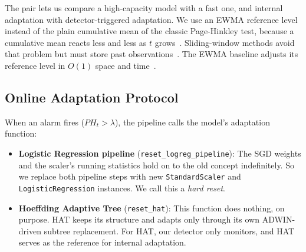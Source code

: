 \documentclass[conference]{IEEEtran}
\begin{document}
The pair lets us compare a high-capacity model with a fast one, and internal adaptation with detector-triggered adaptation.
We use an EWMA reference level instead of the plain cumulative mean of the classic Page-Hinkley test, because a cumulative mean reacts less and less as $t$ grows~\cite{parasteh2024}.
Sliding-window methods avoid that problem but must store past observations~\cite{mulimani2024}.
The EWMA baseline adjusts its reference level in $O(1)$ space and time~\cite{rum2026}.

\subsection{Online Adaptation Protocol}
When an alarm fires ($PH_t > \lambda$), the pipeline calls the model's adaptation function:
\begin{itemize}
    \item \textbf{Logistic Regression pipeline} (\texttt{reset\_logreg\_pipeline}): The SGD weights and the scaler's running statistics hold on to the old concept indefinitely. So we replace both pipeline steps with new \texttt{StandardScaler} and \texttt{LogisticRegression} instances. We call this a \emph{hard reset}.
    \item \textbf{Hoeffding Adaptive Tree} (\texttt{reset\_hat}): This function does nothing, on purpose. HAT keeps its structure and adapts only through its own ADWIN-driven subtree replacement. For HAT, our detector only monitors, and HAT serves as the reference for internal adaptation.
\end{itemize}
\end{document}
